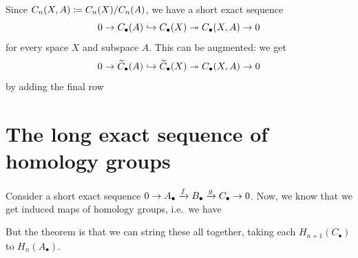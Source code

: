 \begin{example}
	\label{ex:rel_short_exact}
	Since $C_n(X,A) \coloneqq C_n(X) / C_n(A)$, we have a short exact sequence
	\[ 0 \to C_\bullet(A) \hookrightarrow C_\bullet(X) \twoheadrightarrow C_\bullet(X,A) \to 0 \]
	for every space $X$ and subspace $A$.
	This can be augmented: we get
	\[ 0 \to \widetilde C_\bullet(A) \hookrightarrow \widetilde C_\bullet(X)
		\twoheadrightarrow C_\bullet(X,A) \to 0 \]
	by adding the final row
	\begin{center}
	\end{center}
\end{example}

\section{The long exact sequence of homology groups}
Consider a short exact sequence $0 \to A_\bullet \xrightarrow{f} B_\bullet \xrightarrow{g} C_\bullet \to 0$.
Now, we know that we get induced maps of homology groups, i.e.\ we have
\begin{center}
\end{center}
But the theorem is that we can string these all together,
taking each $H_{n+1}(C_\bullet)$ to $H_n(A_\bullet)$.

